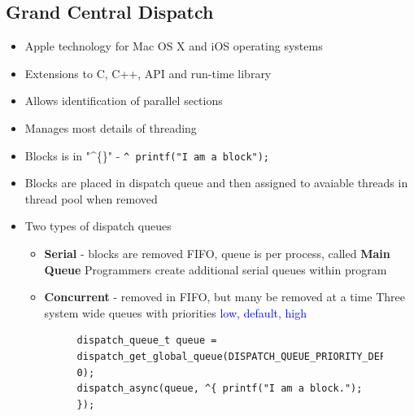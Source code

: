 \documentclass{book/custombook}
\begin{document}
            \subsection{Grand Central Dispatch}
                \begin{itemize}
                    \item Apple technology for Mac OS X and iOS operating systems
                    \item Extensions to C, C++, API and run-time library
                    \item Allows identification of parallel sections
                    \item Manages most details of threading
                    \item Blocks is in "\textasciicircum\{\}" - \texttt{^{ printf("I am a block"); }}
                    \item Blocks are placed in dispatch queue and then assigned to avaiable threads in thread pool when removed
                    \item Two types of dispatch queues
                        \begin{itemize}
                            \item \textbf{Serial} - blocks are removed FIFO, queue is per process, called \textbf{Main Queue}
                                \subitem Programmers create additional serial queues within program
                            \item \textbf{Concurrent} - removed in FIFO, but many be removed at a time
                                \subitem Three system wide queues with priorities \textcolor{blue}{low, default, high}
                                \begin{figure}[H]
                                    \begin{flushleft}
                                        \begin{verbatim}
dispatch_queue_t queue = dispatch_get_global_queue(DISPATCH_QUEUE_PRIORITY_DEFAULT, 0);
dispatch_async(queue, ^{ printf("I am a block."); });
                                        \end{verbatim}
                                    \end{flushleft}
                                \end{figure}
                        \end{itemize}
                \end{itemize}
\end{document}
